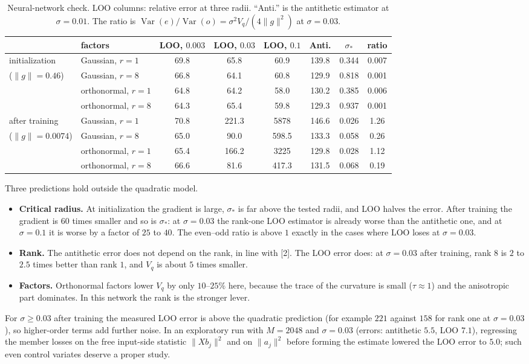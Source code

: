 \documentclass[11pt]{article}
\theoremstyle{remark}
\DeclareMathOperator{\Var}{Var}
\begin{document}
\begin{table}[H]
\centering\small
\caption{Neural-network check. LOO columns: relative error at three radii. ``Anti.'' is the antithetic estimator at $\sigma=0.01$. The ratio is $\Var(e)/\Var(o)=\sigma^2V_q/(4\|g\|^2)$ at $\sigma=0.03$.}\label{tab:nn}
\begin{tabular}{@{}llcccccc@{}}
\toprule
 & factors & LOO, $0.003$ & LOO, $0.03$ & LOO, $0.1$ & Anti. & $\sigma_*$ & ratio\\
\midrule
initialization & Gaussian, $r=1$ & 69.8 & 65.8 & 60.9 & 139.8 & 0.344 & 0.007\\
($\|g\|=0.46$) & Gaussian, $r=8$ & 66.8 & 64.1 & 60.8 & 129.9 & 0.818 & 0.001\\
 & orthonormal, $r=1$ & 64.8 & 64.2 & 58.0 & 130.2 & 0.385 & 0.006\\
 & orthonormal, $r=8$ & 64.3 & 65.4 & 59.8 & 129.3 & 0.937 & 0.001\\
\midrule
after training & Gaussian, $r=1$ & 70.8 & 221.3 & 5878 & 146.6 & 0.026 & 1.26\\
($\|g\|=0.0074$) & Gaussian, $r=8$ & 65.0 & 90.0 & 598.5 & 133.3 & 0.058 & 0.26\\
 & orthonormal, $r=1$ & 65.4 & 166.2 & 3225 & 129.8 & 0.028 & 1.12\\
 & orthonormal, $r=8$ & 66.6 & 81.6 & 417.3 & 131.5 & 0.068 & 0.19\\
\bottomrule
\end{tabular}
\end{table}
Three predictions hold outside the quadratic model.
\begin{itemize}
\item \textbf{Critical radius.} At initialization the gradient is large, $\sigma_*$ is far above the tested radii, and LOO halves the error. After training the gradient is $60$ times smaller and so is $\sigma_*$: at $\sigma=0.03$ the rank-one LOO estimator is already worse than the antithetic one, and at $\sigma=0.1$ it is worse by a factor of $25$ to $40$. The even--odd ratio is above $1$ exactly in the cases where LOO loses at $\sigma=0.03$.
\item \textbf{Rank.} The antithetic error does not depend on the rank, in line with [2]. The LOO error does: at $\sigma=0.03$ after training, rank $8$ is $2$ to $2.5$ times better than rank $1$, and $V_q$ is about $5$ times smaller.
\item \textbf{Factors.} Orthonormal factors lower $V_q$ by only $10$--$25\%$ here, because the trace of the curvature is small ($\tau\approx1$) and the anisotropic part dominates. In this network the rank is the stronger lever.
\end{itemize}
For $\sigma\ge0.03$ after training the measured LOO error is above the quadratic prediction (for example $221$ against $158$ for rank one at $\sigma=0.03$), so higher-order terms add further noise. In an exploratory run with $M=2048$ and $\sigma=0.03$ (errors: antithetic $5.5$, LOO $7.1$), regressing the member losses on the free input-side statistic $\|Xb_j\|^2$ and on $\|a_j\|^2$ before forming the estimate lowered the LOO error to $5.0$; such even control variates deserve a proper study.
\end{document}
